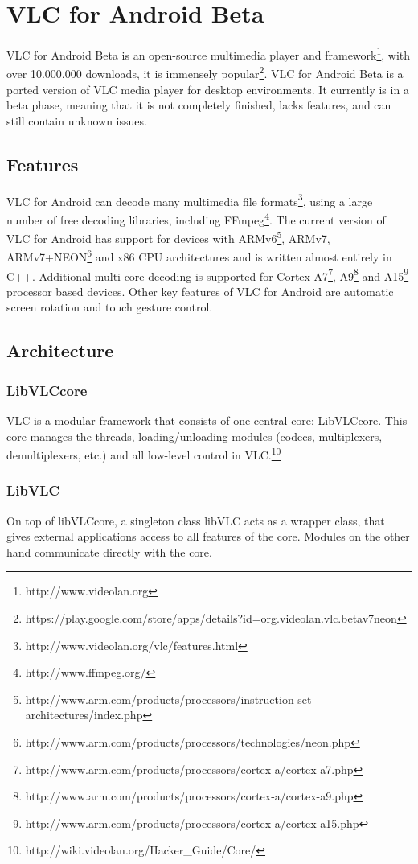\section{VLC for Android Beta}
VLC for Android Beta is an open-source multimedia player and framework\footnote{http://www.videolan.org}, with over 10.000.000 downloads, it is immensely popular\footnote{https://play.google.com/store/apps/details?id=org.videolan.vlc.betav7neon}. VLC for Android Beta is a ported version of VLC media player for desktop environments. It currently is in a beta phase, meaning that it is not completely finished, lacks features, and can still contain unknown issues.
\subsection{Features}
VLC for Android can decode many multimedia file formats\footnote{http://www.videolan.org/vlc/features.html}, using a large number of free decoding libraries, including FFmpeg\footnote{http://www.ffmpeg.org/}. The current version of VLC for Android has support for devices with ARMv6\footnote{http://www.arm.com/products/processors/instruction-set-architectures/index.php}, ARMv7, ARMv7+NEON\footnote{http://www.arm.com/products/processors/technologies/neon.php} and x86 CPU architectures and is written almost entirely in C++. Additional multi-core decoding is supported for Cortex A7\footnote{http://www.arm.com/products/processors/cortex-a/cortex-a7.php}, A9\footnote{http://www.arm.com/products/processors/cortex-a/cortex-a9.php} and A15\footnote{http://www.arm.com/products/processors/cortex-a/cortex-a15.php} processor based devices. Other key features of VLC for Android are automatic screen rotation and touch gesture control.
\subsection{Architecture}
\subsubsection{LibVLCcore}
VLC is a modular framework that consists of one central core: LibVLCcore. This core manages the threads, loading/unloading modules (codecs, multiplexers, demultiplexers, etc.) and all low-level control in VLC.\footnote{http://wiki.videolan.org/Hacker\_Guide/Core/}
\subsubsection{LibVLC}
On top of libVLCcore, a singleton class libVLC acts as a wrapper class, that gives external applications access to all features of the core. Modules on the other hand communicate directly with the core.
